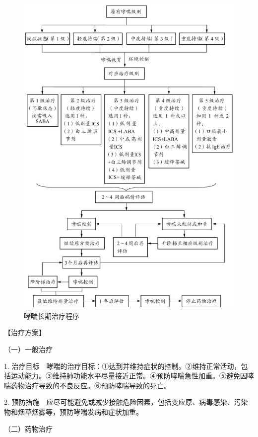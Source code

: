 \begin{figure}[!htbp]
 \centering
 \includegraphics{./images/Image00009.jpg}
 \captionsetup{justification=centering}
 \caption{哮喘长期治疗程序}
 \label{fig1-6-3}
  \end{figure} 

	

【治疗方案】

{（一）一般治疗}

1.
治疗目标　哮喘的治疗目标：①达到并维持症状的控制。②维持正常活动，包括运动能力。③维持肺功能水平尽量接近正常。④预防哮喘急性加重。⑤避免因哮喘药物治疗导致的不良反应。⑥预防哮喘导致的死亡。

2.
预防措施　应尽可能避免或减少接触危险因素，包括变应原、病毒感染、污染物和烟草烟雾等，预防哮喘发病和症状加重。

{（二）药物治疗}

